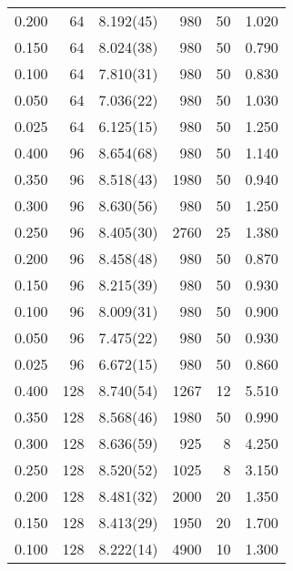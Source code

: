 \begin{tabular}{rrlrrr}
 0.200 &      64 & 8.192(45) &                  980 &                   50 &    1.020 \\
 0.150 &      64 & 8.024(38) &                  980 &                   50 &    0.790 \\
 0.100 &      64 & 7.810(31) &                  980 &                   50 &    0.830 \\
 0.050 &      64 & 7.036(22) &                  980 &                   50 &    1.030 \\
 0.025 &      64 & 6.125(15) &                  980 &                   50 &    1.250 \\
 0.400 &      96 & 8.654(68) &                  980 &                   50 &    1.140 \\
 0.350 &      96 & 8.518(43) &                 1980 &                   50 &    0.940 \\
 0.300 &      96 & 8.630(56) &                  980 &                   50 &    1.250 \\
 0.250 &      96 & 8.405(30) &                 2760 &                   25 &    1.380 \\
 0.200 &      96 & 8.458(48) &                  980 &                   50 &    0.870 \\
 0.150 &      96 & 8.215(39) &                  980 &                   50 &    0.930 \\
 0.100 &      96 & 8.009(31) &                  980 &                   50 &    0.900 \\
 0.050 &      96 & 7.475(22) &                  980 &                   50 &    0.930 \\
 0.025 &      96 & 6.672(15) &                  980 &                   50 &    0.860 \\
 0.400 &     128 & 8.740(54) &                 1267 &                   12 &    5.510 \\
 0.350 &     128 & 8.568(46) &                 1980 &                   50 &    0.990 \\
 0.300 &     128 & 8.636(59) &                  925 &                    8 &    4.250 \\
 0.250 &     128 & 8.520(52) &                 1025 &                    8 &    3.150 \\
 0.200 &     128 & 8.481(32) &                 2000 &                   20 &    1.350 \\
 0.150 &     128 & 8.413(29) &                 1950 &                   20 &    1.700 \\
 0.100 &     128 & 8.222(14) &                 4900 &                   10 &    1.300 \\

\end{tabular}
